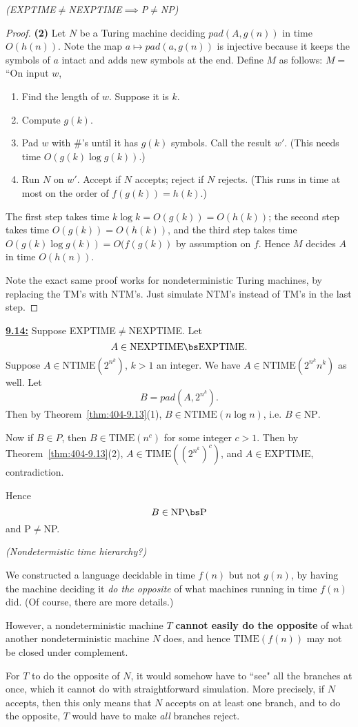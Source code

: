 \begin{problem}{\it(EXPTIME$\ne$NEXPTIME$\implies$P$\ne$NP)}
\begin{proof}
\noindent
\textbf{(2)} Let $N$ be a Turing machine deciding ${pad}(A,g(n))$ in time $O(h(n))$. Note the map $a\mapsto {pad}(a,g(n))$ is injective because it keeps the symbols of $a$ intact and adds new symbols at the end. Define $M$ as follows: $M=$``On input $w$, 
\begin{enumerate}
\item Find the length of $w$. Suppose it is $k$.
\item Compute $g(k)$.
\item Pad $w$ with $\#$'s until it has $g(k)$ symbols. Call the result $w'$. (This needs time $O(g(k)\log g(k))$.)
\item Run $N$ on $w'$. Accept if $N$ accepts; reject if $N$ rejects. (This runs in time at most on the order of $f(g(k))=h(k)$.)
\end{enumerate}
The first step takes time $k\log k=O(g(k))=O(h(k))$; the second step takes time $O(g(k))=O(h(k))$, and the third step takes time $O(g(k)\log g(k))=O(f(g(k))$ by assumption on $f$. Hence $M$ decides $A$ in time $O(h(n))$.

Note the exact same proof works for nondeterministic Turing machines, by replacing the TM's with NTM's. Just simulate NTM's instead of TM's in the last step.
\end{proof}

\noindent
\underline{\textbf{9.14:}} Suppose EXPTIME$\ne$NEXPTIME. Let
\[
A\in \text{NEXPTIME} \bs \text{EXPTIME}. 
\]
Suppose $A\in \text{NTIME}(2^{n^k})$, $k>1$ an integer. We have $A\in \text{NTIME}(2^{n^k} n^k)$ as well. 
Let
\[
B={pad}(A,2^{n^k}).
\]
Then by Theorem~\ref{thm:404-9.13}(1), $B\in \text{NTIME}(n\log n)$, i.e. $B\in \text{NP}$.

Now if $B\in P$, then $B\in \text{TIME}(n^c)$ for some integer $c>1$. Then by Theorem~\ref{thm:404-9.13}(2), $A\in \text{TIME}((2^{n^k})^c)$, and $A\in \text{EXPTIME}$, contradiction.

Hence
\[
B\in \text{NP}\bs \text P
\]
and P$\ne$NP.
\end{problem}

\pagebreak

\begin{problem}{\it(Nondetermistic time hierarchy?)}

We constructed a language decidable in time $f(n)$ but not $g(n)$, by having the machine deciding it {\it do the opposite} of what machines running in time $f(n)$ did. (Of course, there are more details.)

However, a nondeterministic machine $T$ \textbf{cannot easily do the opposite} of what another nondeterministic machine $N$ does, and hence $\text{TIME}(f(n))$ may not be closed under complement.

For $T$ to do the opposite of $N$, it would somehow have to ``see" all the branches at once, which it cannot do with straightforward simulation. More precisely, if $N$ accepts, then this only means that $N$ accepts on at least one branch, and to do the opposite, $T$ would have to make {\it all} branches reject.
\end{problem}

